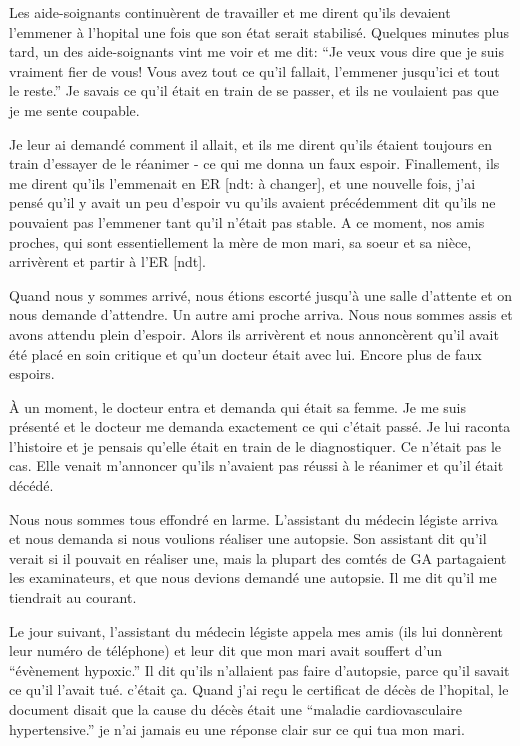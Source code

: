 {Les aide-soignants continuèrent de travailler et me dirent qu'ils devaient l'emmener à l'hopital une fois que son état serait stabilisé. Quelques minutes plus tard, un des aide-soignants vint me voir et me dit: “Je veux vous dire que je suis vraiment fier de vous! Vous avez tout ce qu'il fallait, l'emmener jusqu'ici et tout le reste.” Je savais ce qu'il était en train de se passer, et ils ne voulaient pas que je me sente coupable.

Je leur ai demandé comment il allait, et ils me dirent qu'ils étaient toujours en train d'essayer de le réanimer - ce qui me donna un faux espoir. Finallement, ils me dirent qu'ils l'emmenait en ER [ndt: à changer], et une nouvelle fois, j'ai pensé qu'il y avait un peu d'espoir vu qu'ils avaient précédemment dit qu'ils ne pouvaient pas l'emmener tant qu'il n'était pas stable. A ce moment, nos amis proches, qui sont essentiellement la mère de mon mari, sa soeur et sa nièce, arrivèrent et partir à l'ER [ndt].

Quand nous y sommes arrivé, nous étions escorté jusqu'à une salle d'attente et on nous demande d'attendre. Un autre ami proche arriva. Nous nous sommes assis et avons attendu plein d'espoir. Alors ils arrivèrent et nous annoncèrent qu'il avait été placé en soin critique et qu'un docteur était avec lui. Encore plus de faux espoirs.

À un moment, le docteur entra et demanda qui était sa femme. Je me suis présenté et le docteur me demanda exactement ce qui c'était passé. Je lui raconta l'histoire et je pensais qu'elle était en train de le diagnostiquer. Ce n'était pas le cas. Elle venait m'annoncer qu'ils n'avaient pas réussi à le réanimer et qu'il était décédé.

Nous nous sommes tous effondré en larme. L'assistant du médecin légiste arriva et nous demanda si nous voulions réaliser une autopsie. Son assistant dit qu'il verait si il pouvait en réaliser une, mais la plupart des comtés de GA partagaient les examinateurs, et que nous devions demandé une autopsie. Il me dit qu'il me tiendrait au courant.

Le jour suivant, l'assistant du médecin légiste appela mes amis (ils lui donnèrent leur numéro de téléphone) et leur dit que mon mari avait souffert d'un “évènement hypoxic.” Il dit qu'ils n'allaient pas faire d'autopsie, parce qu'il savait ce qu'il l'avait tué. c'était ça. Quand j'ai reçu le certificat de décès de l'hopital, le document disait que la cause du décès était une “maladie cardiovasculaire hypertensive.” je n'ai jamais eu une réponse clair sur ce qui tua mon mari.

}
